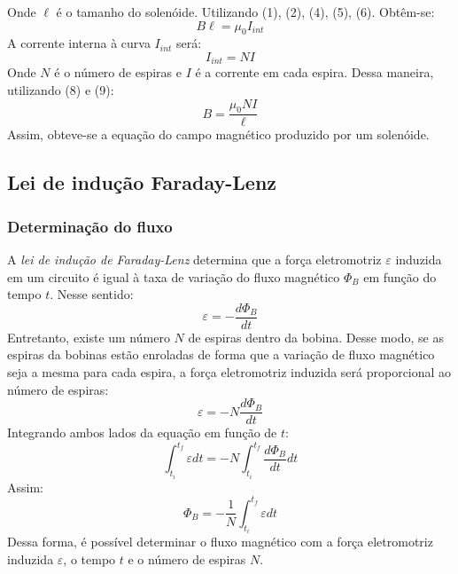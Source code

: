 \documentclass[column,brazilian,12pt,a4paper,final]{article}
\begin{document}
      Onde $\ell$ é o tamanho do solenóide.
      Utilizando (1), (2), (4), (5), (6). Obtêm-se:
      \begin{equation}
        B\ell = \mu_0I_{int}
      \end{equation}
      A corrente interna à curva $I_{int}$ será:
      \begin{equation}
        I_{int} = NI 
      \end{equation}
      Onde $N$ é o número de espiras e $I$ é a corrente em cada espira.
      Dessa maneira, utilizando (8) e (9):
      \begin{equation}
        B = \frac{\mu_0NI}{\ell}
      \end{equation}
      Assim, obteve-se a equação do campo magnético produzido por um
      solenóide.

    \subsection{Lei de indução Faraday-Lenz}
      \subsubsection{Determinação do fluxo}
      A \textit{lei de indução de Faraday-Lenz} determina que a força 
        eletromotriz
        $\varepsilon$ induzida em um circuito é igual à taxa de 
        variação do fluxo
        magnético $\Phi_B$ em função do tempo $t$. Nesse sentido:
        \begin{equation}
          \varepsilon = - \frac{d\Phi_B}{dt}
        \end{equation}
        Entretanto, existe um número $N$ de espiras dentro da bobina.
        Desse modo, se as espiras da bobinas estão enroladas de forma que a 
        variação de fluxo magnético seja a mesma para cada espira, a força
        eletromotriz induzida será proporcional ao número de espiras:
        \begin{equation}
          \varepsilon = - N\frac{d\Phi_B}{dt}
        \end{equation}
        Integrando ambos lados da equação em função de $t$:
        \begin{equation}
          \int_{t_i}^{t_f} \varepsilon dt = - N \int_{t_i}^{t_f} 
          \frac{d\Phi_B}{dt} dt
        \end{equation}
        Assim:
        \begin{equation}
          \Phi_B = - \frac{1}{N} \int_{t_i}^{t_f} \varepsilon dt
        \end{equation}
        Dessa forma, é possível determinar o fluxo magnético com a força 
        eletromotriz induzida $\varepsilon$, o tempo $t$ e o número de 
        espiras $N$.
\end{document}
